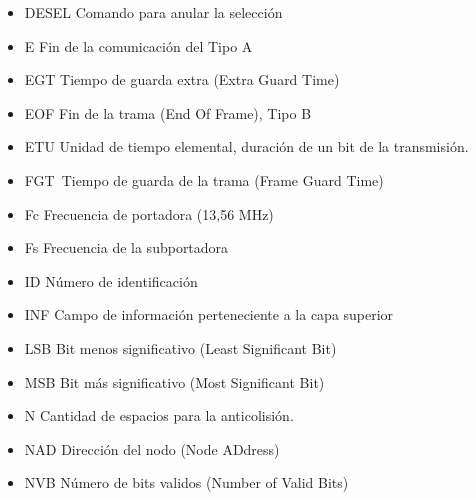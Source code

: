 \begin{itemize}
	\item DESEL Comando para anular la selección\par

	\item E Fin de la comunicación del Tipo A\par

	\item EGT Tiempo de guarda extra (Extra Guard Time)\par

	\item EOF Fin de la trama (End Of Frame), Tipo B\par

	\item ETU Unidad de tiempo elemental, duración de un bit de la transmisión.\par

	\item FGT\ Tiempo de guarda de  la trama (Frame Guard Time)\par

	\item Fc Frecuencia de portadora (13,56 MHz)\par

	\item Fs Frecuencia de la subportadora\par

	\item ID Número de identificación\par

	\item INF Campo de información perteneciente a la capa superior\par

	\item LSB Bit menos significativo (Least Significant Bit)\par

	\item MSB Bit más significativo (Most Significant Bit)\par

	\item N Cantidad de espacios para la anticolisión.\par

	\item NAD Dirección del nodo (Node ADdress)\par

	\item NVB Número de bits validos (Number of Valid Bits)\par


\end{itemize}
